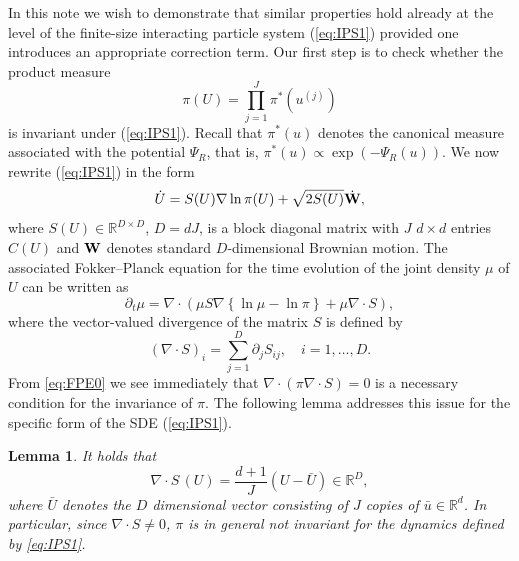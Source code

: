 \documentclass[11pt]{article}
\newtheorem{lemma}[theorem]{Lemma}
\begin{document}
In this note we wish to demonstrate that similar properties hold already at the level of the finite-size interacting particle system
(\ref{eq:IPS1}) provided one introduces an appropriate correction term. Our first step is to check whether the product measure
\begin{equation} \label{eq:TPDF}
\pi(U) = \prod_{j=1}^J \pi^\ast(u^{(j)})
\end{equation}
is invariant under (\ref{eq:IPS1}). Recall that $\pi^\ast(u)$ denotes 
the canonical measure associated with the potential $\Psi_R$, that is, $\pi^\ast(u) \propto \exp(-\Psi_R(u))$.
We now rewrite (\ref{eq:IPS1}) in the form
\begin{equation} \label{eq:IPS2}
\dot{U} = S(U)\nabla \ln \pi(U) + \sqrt{2S(U)}\dot{\bf W},
\end{equation}
where $S(U) \in \mathbb{R}^{D\times D}$, $D = dJ$, is a block diagonal matrix with $J$ $d\times d$ entries $C(U)$ and ${\bf W}$ denotes
standard $D$-dimensional Brownian motion. The associated Fokker--Planck equation \cite{sr:P14} 
for the time evolution of the joint density $\mu$ of $U$ can be written as
\begin{equation} \label{eq:FPE0}
\partial_t \mu = \nabla \cdot \left( \mu S \nabla \left\{\ln \mu - \ln \pi \right\} + \mu \nabla \cdot S \right),
\end{equation}
where the vector-valued divergence of the matrix $S$ is defined by
\begin{equation}
(\nabla \cdot S)_i = \sum_{j=1}^D \partial_j S_{ij}, \quad i= 1,\ldots, D.
\end{equation}
From \eqref{eq:FPE0} we see immediately that $\nabla \cdot (\pi \nabla \cdot S) = 0$ is a necessary condition for the invariance of $\pi$.
The following lemma addresses this issue for the specific form of the SDE (\ref{eq:IPS1}).

\begin{lemma} \label{lemma1}
It holds that
\begin{equation}
\nabla \cdot S\,(U) = \frac{d+1}{J}\left(U-\bar U\right) \in \mathbb{R}^D,
\end{equation} 
where $\bar U$ denotes the $D$ dimensional vector consisting of $J$ copies of $\bar u \in \mathbb{R}^d$. In particular, since $\nabla \cdot S \neq 0$, $\pi$ is in general not invariant for the dynamics defined by \eqref{eq:IPS1}.
\end{lemma}
\end{document}
